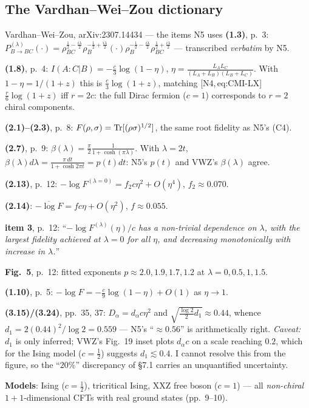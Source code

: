 \documentclass[11pt]{article}
\newcommand{\Nf}[1]{\textsf{[N4,\,#1]}}
\begin{document}
\subsection{The Vardhan--Wei--Zou dictionary}
\begin{citedbox}{Vardhan--Wei--Zou, arXiv:2307.14434 --- the items N5 uses}
\textbf{(1.3)}, p.~3: $P^{(\lambda)}_{B\to BC}(\cdot)=\rho_{BC}^{\frac12-\frac{i\lambda}2}
\rho_B^{-\frac12+\frac{i\lambda}2}(\cdot)\rho_B^{-\frac12-\frac{i\lambda}2}
\rho_{BC}^{\frac12+\frac{i\lambda}2}$ --- transcribed \emph{verbatim} by N5.  \checkmark

\textbf{(1.8)}, p.~4: $I(A{:}C|B)=-\tfrac c3\log(1-\eta)$,
$\eta=\frac{L_AL_C}{(L_A+L_B)(L_B+L_C)}$.  With $1-\eta=1/(1+z)$ this is $\tfrac c3\log(1+z)$,
matching \Nf{eq:CMI-LX} $\tfrac r6\log(1+z)$ iff $r=2c$: the full Dirac fermion ($c=1$)
corresponds to $r=2$ chiral components.  \checkmark

\textbf{(2.1)--(2.3)}, p.~8: $F(\rho,\sigma)=\operatorname{Tr}[(\rho\sigma)^{1/2}]$, the same root fidelity
as N5's (C4).  \checkmark

\textbf{(2.7)}, p.~9: $\beta(\lambda)=\frac\pi2\frac1{1+\cosh(\pi\lambda)}$.  With $\lambda=2t$,
$\beta(\lambda)d\lambda=\frac{\pi\,dt}{1+\cosh2\pi t}=p(t)dt$: N5's $p(t)$ and VWZ's
$\beta(\lambda)$ agree.  \checkmark

\textbf{(2.13)}, p.~12: $-\log F^{(\lambda=0)}=f_2c\eta^2+O(\eta^4)$, $f_2\approx0.070$.  \checkmark

\textbf{(2.14)}: $\overline{-\log F}=fc\eta+O(\eta^2)$, $f\approx0.055$.

\textbf{item 3}, p.~12: ``\emph{$-\log F^{(\lambda)}(\eta)/c$ has a non-trivial dependence on
$\lambda$, with the largest fidelity achieved at $\lambda=0$ for all $\eta$, and decreasing
monotonically with increase in $\lambda$.}''
\begin{center}\end{center}

\textbf{Fig.~5}, p.~12: fitted exponents $p\approx2.0,1.9,1.7,1.2$ at $\lambda=0,0.5,1,1.5$.  \checkmark

\textbf{(1.10)}, p.~5: $-\log F=-\tfrac c9\log(1-\eta)+O(1)$ as $\eta\to1$.  \checkmark

\textbf{(3.15)/(3.24)}, pp.~35, 37: $D_\alpha=d_\alpha c\eta^2$ and
$\sqrt{\tfrac{\log2}2 d_1}\approx0.44$, whence $d_1=2(0.44)^2/\log2=0.559$ --- N5's ``$\approx0.56$''
is arithmetically right.  \emph{Caveat:} $d_1$ is only inferred; VWZ's Fig.~19 inset plots
$d_\alpha c$ on a scale reaching $0.2$, which for the Ising model ($c=\tfrac12$) suggests
$d_1\lesssim0.4$.  I cannot resolve this from the figure, so the ``$20\%$'' discrepancy of \S7.1
carries an unquantified uncertainty.

\textbf{Models}: Ising ($c=\tfrac12$), tricritical Ising, XXZ free boson ($c=1$) --- all
\emph{non-chiral} $1{+}1$-dimensional CFTs with real ground states (pp.~9--10).
\end{citedbox}
\end{document}
